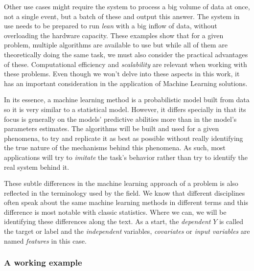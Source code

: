 Other use cases might require the system to process a big volume of data at once, not a single event, but a batch of these and output this answer. The system in use needs to be prepared to run \textit{lean} with a big inflow of data, without overloading the hardware capacity.  These examples show that for a given problem, multiple algorithms are available to use but while all of them are theoretically doing the same task, we must also consider the practical advantages of these. Computational efficiency and \textit{scalability} are relevant when working with these problems. Even though we won't delve into these aspects in this work, it has an important consideration in the application of Machine Learning solutions.


In its essence, a machine learning method is a probabilistic model built from data so it is very similar to a statistical model. However, it differs specially in that its focus is generally on the models' predictive abilities more than in the model's parameters estimates.\textcite{breiman-statisticalmodeling} The algorithms will be built and used for a given phenomena, to try and replicate it as best as possible without really identifying the true nature of the mechanisms behind this phenomena. As such, most applications will try to \textit{imitate} the task's behavior rather than try to identify the real system behind it.


These subtle differences in the machine learning approach of a problem is also reflected in the terminology used by the field. We know that different disciplines often speak about the same machine learning methods in different terms and this difference is most notable with classic statistics. Where we can, we will be identifying these differences along the text. As a start, the \textit{dependent} $Y$ is called the target or label and the \textit{independent} variables, \textit{covariates} or \textit{input variables} are named \textit{features} in this case.


\subsubsection{A working example}\label{section-example}

